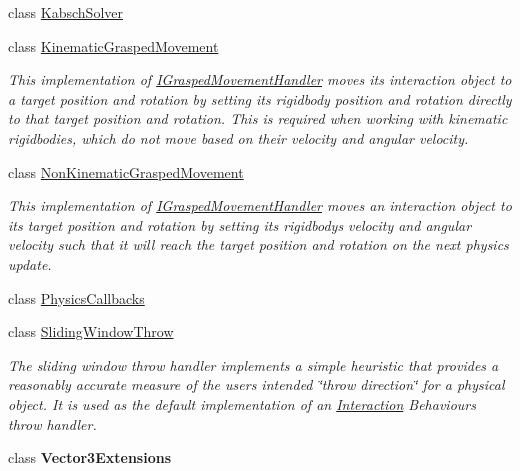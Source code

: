 \begin{DoxyCompactItemize}
class \mbox{\hyperlink{class_leap_1_1_unity_1_1_interaction_1_1_kabsch_solver}{Kabsch\+Solver}}
\item 
class \mbox{\hyperlink{class_leap_1_1_unity_1_1_interaction_1_1_kinematic_grasped_movement}{Kinematic\+Grasped\+Movement}}
\begin{DoxyCompactList}\small\item\em This implementation of \mbox{\hyperlink{interface_leap_1_1_unity_1_1_interaction_1_1_i_grasped_movement_handler}{I\+Grasped\+Movement\+Handler}} moves its interaction object to a target position and rotation by setting its rigidbody position and rotation directly to that target position and rotation. This is required when working with kinematic rigidbodies, which do not move based on their velocity and angular velocity. \end{DoxyCompactList}\item 
class \mbox{\hyperlink{class_leap_1_1_unity_1_1_interaction_1_1_non_kinematic_grasped_movement}{Non\+Kinematic\+Grasped\+Movement}}
\begin{DoxyCompactList}\small\item\em This implementation of \mbox{\hyperlink{interface_leap_1_1_unity_1_1_interaction_1_1_i_grasped_movement_handler}{I\+Grasped\+Movement\+Handler}} moves an interaction object to its target position and rotation by setting its rigidbody\textquotesingle{}s velocity and angular velocity such that it will reach the target position and rotation on the next physics update. \end{DoxyCompactList}\item 
class \mbox{\hyperlink{class_leap_1_1_unity_1_1_interaction_1_1_physics_callbacks}{Physics\+Callbacks}}
\item 
class \mbox{\hyperlink{class_leap_1_1_unity_1_1_interaction_1_1_sliding_window_throw}{Sliding\+Window\+Throw}}
\begin{DoxyCompactList}\small\item\em The sliding window throw handler implements a simple heuristic that provides a reasonably accurate measure of the user\textquotesingle{}s intended \char`\"{}throw direction\char`\"{} for a physical object. It is used as the default implementation of an \mbox{\hyperlink{namespace_leap_1_1_unity_1_1_interaction}{Interaction}} Behaviour\textquotesingle{}s throw handler. \end{DoxyCompactList}\item 
class {\bfseries Vector3\+Extensions}
\end{DoxyCompactItemize}
